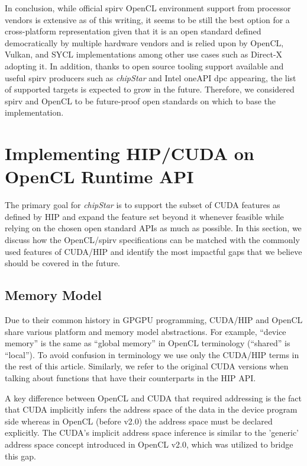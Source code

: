 \documentclass[Afour,sageh,times]{sagej}
\newcommand{\chipstar}{\textit{chipStar}\xspace}
\begin{document}
In conclusion, while official \gls{spirv} OpenCL environment support from processor vendors is extensive as of this writing, it seems to be still the best option for a cross-platform representation given that it is an open standard defined democratically by multiple hardware vendors and is relied upon by OpenCL, Vulkan, and SYCL implementations among other use cases such as Direct-X adopting it.
In addition, thanks to open source tooling support available and useful \gls{spirv} producers such as \chipstar and Intel oneAPI \gls{dpc} appearing, the list of supported targets is expected to grow in the future. Therefore, we considered \gls{spirv} and OpenCL to be future-proof open standards on which to base the implementation.

\section{Implementing HIP/CUDA on OpenCL Runtime API}
\label{section:implementation}

The primary goal for \chipstar is to support the subset of CUDA features
as defined by HIP and expand the feature set beyond it whenever feasible
while relying on the chosen open standard APIs as much as possible.
In this section, we discuss how the OpenCL/\gls{spirv} specifications can be matched with
the commonly used features of CUDA/HIP and identify the most impactful gaps
that we believe should be covered in the future.

\subsection{Memory Model}

Due to their common history in GPGPU programming, CUDA/HIP and OpenCL share various
platform and memory model abstractions. For example, ``device memory'' is the same as
``global memory'' in OpenCL terminology (``shared'' is ``local'').
To avoid confusion in terminology we use only the CUDA/HIP terms in the rest of
this article. Similarly, we refer to the original CUDA versions when talking about
functions that have their counterparts in the HIP API.

A key difference between OpenCL and CUDA that required addressing is the
fact that CUDA implicitly infers the address space of the data in the device
program side whereas in OpenCL (before v2.0) the address space must be declared explicitly.
The CUDA's implicit address space inference is similar to the 'generic'
address space concept introduced in OpenCL v2.0, which was utilized to bridge
this gap.
\end{document}
